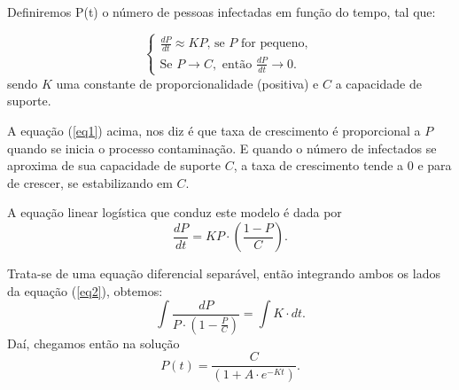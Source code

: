 \documentclass{article}
\begin{document}
Definiremos P(t) o número de pessoas infectadas em função do tempo, tal que:

\begin{equation} \label{eq1}
	\left\{ \begin{split} \frac{dP}{dt} \approx KP\textrm{, se } P \textrm{ for pequeno, } \\
	\textrm{Se } P \rightarrow C, \textrm{ então } \frac{dP}{dt} \rightarrow 0.
\end{split} \right.
\end{equation}
sendo $K$ uma constante de proporcionalidade (positiva) e $C$ a capacidade de suporte. 

A equação (\ref{eq1}) acima, nos diz é que taxa de crescimento é proporcional a $ P $ quando se inicia o processo contaminação. E quando o número de infectados se aproxima de sua capacidade de suporte $ C $, a taxa de crescimento tende a $0$ e para de crescer, se estabilizando em $ C $.

A equação linear logística que conduz este modelo é dada por 
\begin{equation} \label{eq2}
	\frac{dP}{dt} = KP \cdot \left(  \dfrac{1-P}{C} \right).
\end{equation}

Trata-se de uma equação diferencial separável, então integrando ambos os lados da equação (\ref{eq2}), obtemos: 
\begin{equation}
	\int \dfrac{dP}{P\cdot \left(1-\frac{P}{C} \right)} = \int K\cdot dt.
\end{equation}
Daí, chegamos então na solução
\begin{equation}
	P(t) = \frac{C}{(1 + A \cdot e^{-Kt})}.
\end{equation}
\end{document}
